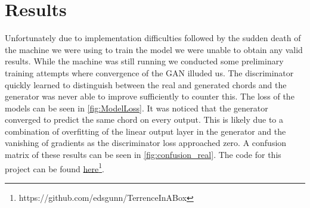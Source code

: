 \section{Results}
Unfortunately due to implementation difficulties followed by the sudden death of the machine we were using to train the model we were unable to obtain any valid results.
While the machine was still running we conducted some preliminary training attempts where convergence of the GAN illuded us.
The discriminator quickly learned to distinguish between the real and generated chords and the generator was never able to improve sufficiently to counter this.
The loss of the models can be seen in \cref{fig:ModelLoss}.
It was noticed that the generator converged to predict the same chord on every output. 
This is likely due to a combination of overfitting of the linear output layer in the generator and the vanishing of gradients as the discriminator loss approached zero.
A confusion matrix of these results can be seen in \cref{fig:confusion_real}. The code for this project can be found \href{https://github.com/edsgunn/TerrenceInABox}{here}\footnote{https://github.com/edsgunn/TerrenceInABox}.


